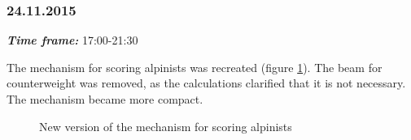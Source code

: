 \subsubsection{24.11.2015}
\textit{\textbf{Time frame:}} 17:00-21:30

The mechanism for scoring alpinists was recreated (figure \ref{Alpinists0.4}). The beam for counterweight was removed, as the calculations clarified that it is not necessary. The mechanism became more compact.

\begin{figure}[H]
	\begin{minipage}[h]{1\linewidth}
		\caption{New version of the mechanism for scoring alpinists}
		\label{Alpinists0.4}
	\end{minipage}
\end{figure}

